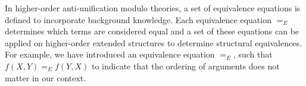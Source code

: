 %
%

In higher-order anti-unification modulo theories, a set of equivalence equations is defined to incorporate background knowledge. Each equivalence equation $=_E$ determines which terms are considered equal and a set of these equations can be applied on higher-order extended structures to determine structural equivalences. For example, we have introduced an equivalence equation $=_E$, such that $f(X,Y) =_E f(Y,X)$ to indicate that the ordering of arguments does not matter in our context.

